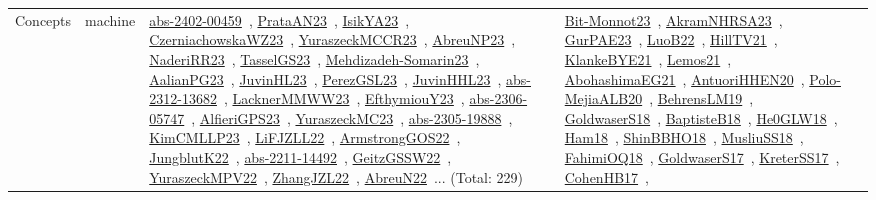 {\begin{longtable}{lp{3cm}>{\raggedright\arraybackslash}p{6cm}>{\raggedright\arraybackslash}p{6cm}>{\raggedright\arraybackslash}p{8cm}}
Concepts & machine & \href{works/abs-2402-00459.pdf}{abs-2402-00459}~\cite{abs-2402-00459}, \href{works/PrataAN23.pdf}{PrataAN23}~\cite{PrataAN23}, \href{works/IsikYA23.pdf}{IsikYA23}~\cite{IsikYA23}, \href{works/CzerniachowskaWZ23.pdf}{CzerniachowskaWZ23}~\cite{CzerniachowskaWZ23}, \href{works/YuraszeckMCCR23.pdf}{YuraszeckMCCR23}~\cite{YuraszeckMCCR23}, \href{works/AbreuNP23.pdf}{AbreuNP23}~\cite{AbreuNP23}, \href{works/NaderiRR23.pdf}{NaderiRR23}~\cite{NaderiRR23}, \href{works/TasselGS23.pdf}{TasselGS23}~\cite{TasselGS23}, \href{works/Mehdizadeh-Somarin23.pdf}{Mehdizadeh-Somarin23}~\cite{Mehdizadeh-Somarin23}, \href{works/AalianPG23.pdf}{AalianPG23}~\cite{AalianPG23}, \href{works/JuvinHL23.pdf}{JuvinHL23}~\cite{JuvinHL23}, \href{works/PerezGSL23.pdf}{PerezGSL23}~\cite{PerezGSL23}, \href{works/JuvinHHL23.pdf}{JuvinHHL23}~\cite{JuvinHHL23}, \href{works/abs-2312-13682.pdf}{abs-2312-13682}~\cite{abs-2312-13682}, \href{works/LacknerMMWW23.pdf}{LacknerMMWW23}~\cite{LacknerMMWW23}, \href{works/EfthymiouY23.pdf}{EfthymiouY23}~\cite{EfthymiouY23}, \href{works/abs-2306-05747.pdf}{abs-2306-05747}~\cite{abs-2306-05747}, \href{works/AlfieriGPS23.pdf}{AlfieriGPS23}~\cite{AlfieriGPS23}, \href{works/YuraszeckMC23.pdf}{YuraszeckMC23}~\cite{YuraszeckMC23}, \href{works/abs-2305-19888.pdf}{abs-2305-19888}~\cite{abs-2305-19888}, \href{works/KimCMLLP23.pdf}{KimCMLLP23}~\cite{KimCMLLP23}, \href{works/LiFJZLL22.pdf}{LiFJZLL22}~\cite{LiFJZLL22}, \href{works/ArmstrongGOS22.pdf}{ArmstrongGOS22}~\cite{ArmstrongGOS22}, \href{works/JungblutK22.pdf}{JungblutK22}~\cite{JungblutK22}, \href{works/abs-2211-14492.pdf}{abs-2211-14492}~\cite{abs-2211-14492}, \href{works/GeitzGSSW22.pdf}{GeitzGSSW22}~\cite{GeitzGSSW22}, \href{works/YuraszeckMPV22.pdf}{YuraszeckMPV22}~\cite{YuraszeckMPV22}, \href{works/ZhangJZL22.pdf}{ZhangJZL22}~\cite{ZhangJZL22}, \href{works/AbreuN22.pdf}{AbreuN22}~\cite{AbreuN22}... (Total: 229) & \href{works/Bit-Monnot23.pdf}{Bit-Monnot23}~\cite{Bit-Monnot23}, \href{works/AkramNHRSA23.pdf}{AkramNHRSA23}~\cite{AkramNHRSA23}, \href{works/GurPAE23.pdf}{GurPAE23}~\cite{GurPAE23}, \href{works/LuoB22.pdf}{LuoB22}~\cite{LuoB22}, \href{works/HillTV21.pdf}{HillTV21}~\cite{HillTV21}, \href{works/KlankeBYE21.pdf}{KlankeBYE21}~\cite{KlankeBYE21}, \href{works/Lemos21.pdf}{Lemos21}~\cite{Lemos21}, \href{works/AbohashimaEG21.pdf}{AbohashimaEG21}~\cite{AbohashimaEG21}, \href{works/AntuoriHHEN20.pdf}{AntuoriHHEN20}~\cite{AntuoriHHEN20}, \href{works/Polo-MejiaALB20.pdf}{Polo-MejiaALB20}~\cite{Polo-MejiaALB20}, \href{works/BehrensLM19.pdf}{BehrensLM19}~\cite{BehrensLM19}, \href{works/GoldwaserS18.pdf}{GoldwaserS18}~\cite{GoldwaserS18}, \href{works/BaptisteB18.pdf}{BaptisteB18}~\cite{BaptisteB18}, \href{works/He0GLW18.pdf}{He0GLW18}~\cite{He0GLW18}, \href{works/Ham18.pdf}{Ham18}~\cite{Ham18}, \href{works/ShinBBHO18.pdf}{ShinBBHO18}~\cite{ShinBBHO18}, \href{works/MusliuSS18.pdf}{MusliuSS18}~\cite{MusliuSS18}, \href{works/FahimiOQ18.pdf}{FahimiOQ18}~\cite{FahimiOQ18}, \href{works/GoldwaserS17.pdf}{GoldwaserS17}~\cite{GoldwaserS17}, \href{works/KreterSS17.pdf}{KreterSS17}~\cite{KreterSS17}, \href{works/CohenHB17.pdf}{CohenHB17}~\cite{CohenHB17}, 
\end{longtable}}
